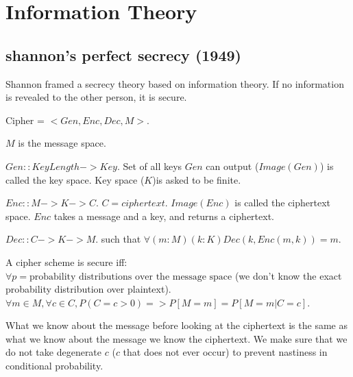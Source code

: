 \section{Information Theory}

\subsection{shannon's perfect secrecy (1949)}
Shannon framed a secrecy theory based on information theory. If no
information is revealed to the other person, it is secure.

Cipher = $<Gen, Enc, Dec, M>$.

$M$ is the message space.

$Gen :: KeyLength -> Key$. Set of all keys $Gen$ can output
($Image(Gen)$) is called the key space. Key space ($K$)is asked to be finite.


$Enc :: M -> K -> C$. $C = ciphertext$. $Image(Enc)$ is called the ciphertext space.
$Enc$ takes a message and a key, and returns a ciphertext.

$Dec :: C -> K -> M$. such that $\forall (m: M) (k: K) Dec(k, Enc (m, k)) = m$.

 
A cipher scheme is secure iff: $\forall p = \text{probability distributions over the message space}$
(we don't know the exact probability distribution over
plaintext).
$\forall m \in M, \forall c \in C, P(C = c > 0) => P[M=m] = P[M=m | C=c]$.

What we know about the message before looking at the
ciphertext is the same as what we know about the message  we know the ciphertext.
We make sure that we do not take degenerate $c$ ($c$ that does not ever occur) to prevent nastiness in
conditional probability.
